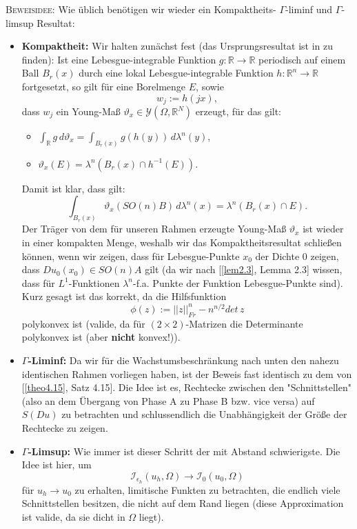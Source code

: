 \textsc{Beweisidee:} Wie üblich benötigen wir wieder ein Kompaktheits- \(\Gamma\)-liminf und \(\Gamma\)-limsup Resultat:
\begin{itemize}
    \item \textbf{Kompaktheit:} Wir halten zunächst fest (das Ursprungsresultat ist in \cite{ball1984w1} zu finden): Ist eine Lebesgue-integrable Funktion \(g : \mathbb{R} \to \mathbb{R}\) periodisch auf einem Ball \(B_r(x)\) durch eine lokal Lebesgue-integrable Funktion \(h:\mathbb{R}^n \to \mathbb{R}\) fortgesetzt, so gilt für eine Borelmenge \(E\), sowie
    \begin{equation}
        w_j := h(jx),
    \end{equation}
    dass \(w_j\) ein Young-Maß \(\vartheta_x \in \mathcal{Y}(\Omega,\mathbb{R}^N)\) erzeugt, für das gilt:
    \begin{itemize}
        \item \(\int_{\mathbb{R}} g \,d\vartheta_x = \int_{B_r(x)} g(h(y)) \,d\lambda^n(y)\),
        \item \(\vartheta_x(E) = \lambda^n(B_r(x) \cap h^{-1}(E))\).
    \end{itemize}
    Damit ist klar, dass gilt:
    \begin{equation}
        \int_{B_r(x)} \vartheta_x(SO(n)B) \,d\lambda^n(x) = \lambda^n(B_r(x) \cap E).
    \end{equation}
    Der Träger von dem für unseren Rahmen erzeugte Young-Maß \(\vartheta_x\) ist wieder in einer kompakten Menge, weshalb wir das Kompaktheitsresultat schließen können, wenn wir zeigen, dass für Lebesgue-Punkte \(x_0\) der Dichte 0 zeigen, dass \(Du_0(x_0) \in SO(n)A\) gilt (da wir nach [\ref{lem2.3}, Lemma 2.3] wissen, dass für \(L^1\)-Funktionen \(\lambda^n\)-f.a. Punkte der Funktion Lebesgue-Punkte sind). Kurz gesagt ist das korrekt, da die Hilfsfunktion
    \begin{equation}
        \phi(z) := ||z||^n_{Fr} - n^{n/2} det \,z
    \end{equation}
    polykonvex ist (valide, da für \((2 \times 2)\)-Matrizen die Determinante polykonvex ist (aber \textbf{nicht} konvex!)).
    \item \textbf{\(\Gamma\)-Liminf:} Da wir für die Wachstumsbeschränkung nach unten den nahezu identischen Rahmen vorliegen haben, ist der Beweis fast identisch zu dem von [\ref{theo4.15}, Satz 4.15]. Die Idee ist es, Rechtecke zwischen den "Schnittstellen" (also an dem Übergang von Phase A zu Phase B bzw. vice versa) auf \(S(Du)\) zu betrachten und schlussendlich die Unabhängigkeit der Größe der Rechtecke zu zeigen.
    \item \textbf{\(\Gamma\)-Limsup:} Wie immer ist dieser Schritt der mit Abstand schwierigste. Die Idee ist hier, um
    \begin{equation}
        \mathcal{I}_{\epsilon_h}(u_h,\Omega) \to \mathcal{I}_0(u_0,\Omega)
    \end{equation}
    für \(u_h \to u_0\) zu erhalten, limitische Funkten zu betrachten, die endlich viele Schnittstellen besitzen, die nicht auf dem Rand liegen (diese Approximation ist valide, da sie dicht in \(\Omega\) liegt). \QEDB
\end{itemize}

